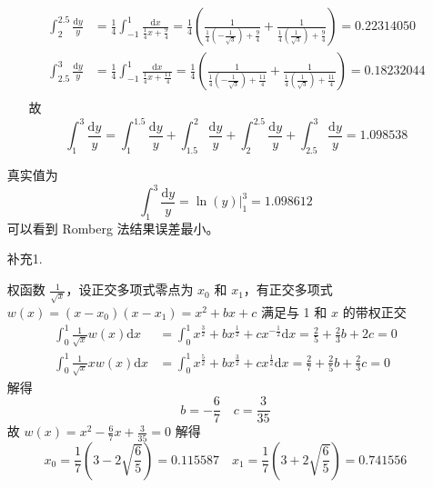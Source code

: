 \documentclass{sjtuarticle}
\def\dd{\mathrm{d}}
\begin{document}
\begin{itemize}
\begin{solution}
\begin{itemize}
\begin{align*}
                \int_{2}^{2.5} \frac{\dd y}{y}&=\frac{1}{4}\int_{-1}^1 \frac{\dd x}{\frac{1}{4}x+\frac{9}{4}}=\frac{1}{4}\left(\frac{1}{\frac{1}{4}\left(-\frac{1}{\sqrt{3}}\right)+\frac{9}{4}}+\frac{1}{\frac{1}{4}\left(\frac{1}{\sqrt{3}}\right)+\frac{9}{4}}\right)=0.22314050\\
                \int_{2.5}^{3} \frac{\dd y}{y}&=\frac{1}{4}\int_{-1}^1 \frac{\dd x}{\frac{1}{4}x+\frac{11}{4}}=\frac{1}{4}\left(\frac{1}{\frac{1}{4}\left(-\frac{1}{\sqrt{3}}\right)+\frac{11}{4}}+\frac{1}{\frac{1}{4}\left(\frac{1}{\sqrt{3}}\right)+\frac{11}{4}}\right)=0.18232044\\
            \end{align*}
            故
            \begin{equation*}
                \int_{1}^{3} \frac{\dd y}{y} = \int_{1}^{1.5} \frac{\dd y}{y} + \int_{1.5}^{2} \frac{\dd y}{y} + \int_{2}^{2.5} \frac{\dd y}{y}+ \int_{2.5}^{3} \frac{\dd y}{y}=1.098538
            \end{equation*}
        \end{itemize}
        真实值为
        \begin{equation*}
            \int_1^3 \frac{\dd y}{y} = \ln(y)\bigg|_1^3 = 1.098612
        \end{equation*}
        可以看到 Romberg 法结果误差最小。
    \end{solution}
    \item[补充1.] \begin{solution}
        权函数 $\frac{1}{\sqrt{x}}$，设正交多项式零点为 $x_0$ 和 $x_1$，有正交多项式 $w(x)=(x-x_0)(x-x_1)=x^2+bx+c$ 满足与 1 和 $x$ 的带权正交
        \begin{align*}
            \int_0^1 \frac{1}{\sqrt{x}}w(x)\dd x&=\int_0^1 x^{\frac{3}{2}}+bx^{\frac{1}{2}}+cx^{-\frac{1}{2}}\dd x=\frac{2}{5}+\frac{2}{3}b+2c=0\\
            \int_0^1 \frac{1}{\sqrt{x}}xw(x)\dd x&=\int_0^1 x^{\frac{5}{2}}+bx^{\frac{3}{2}}+cx^{\frac{1}{2}}\dd x=\frac{2}{7}+\frac{2}{5}b+\frac{2}{3}c=0
        \end{align*}
        解得
        \begin{equation*}
            b =-\frac{6}{7} \quad c = \frac{3}{35}
        \end{equation*}
        故 $w(x)=x^2-\frac{6}{7}x+\frac{3}{35}=0$ 解得
        \begin{equation*}
            x_0=\frac{1}{7}\left(3-2\sqrt{\frac{6}{5}}\right)=0.115587\quad x_1=\frac{1}{7}\left(3+2\sqrt{\frac{6}{5}}\right)=0.741556
        \end{equation*}

\end{solution}
\end{itemize}
\end{document}
